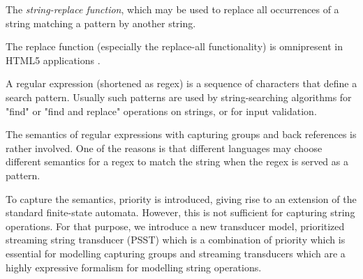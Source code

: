 {%
%
%

The \emph{string-replace function}, 
which may be used to replace all occurrences of a string matching a pattern by 
another string. 

The replace function (especially 
the replace-all functionality) is omnipresent in HTML5 applications
\cite{LB16,TCJ16,YABI14}. 

A regular expression (shortened as regex) is a sequence of characters that define a search pattern. Usually such patterns are used by string-searching algorithms for "find" or "find and replace" operations on strings, or for input validation.  

The semantics of regular expressions with capturing groups and back references is rather involved. One of the reasons is that different languages may choose different semantics for a regex to match the string when the regex is served as a pattern. 

To capture the semantics, priority is introduced, giving rise to an extension of the standard finite-state automata. However, this is not sufficient for capturing string operations. For that purpose, we introduce  a new transducer model, prioritized streaming string transducer (PSST) which is a combination of priority which is essential for modelling capturing groups and streaming transducers which are a highly expressive formalism for modelling string operations. 
}
